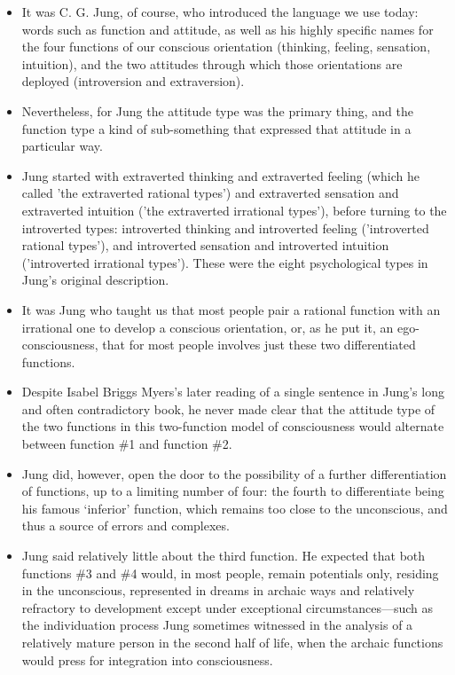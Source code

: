 \begin{itemize}

\item It was C. G. Jung, of course, who introduced the language we use today:
words such as function and attitude, as well as his highly specific names for
the four functions of our conscious orientation (thinking, feeling, sensation,
intuition), and the two attitudes through which those orientations are deployed
(introversion and extraversion).

\item Nevertheless, for Jung the attitude type was the primary thing, and the
function type a kind of sub-something that expressed that attitude in a
particular way.

\item Jung started with extraverted thinking and extraverted feeling (which he
called 'the extraverted rational types') and extraverted sensation and
extraverted intuition ('the extraverted irrational types'), before turning to
the introverted types: introverted thinking and introverted feeling
('introverted rational types'), and introverted sensation and introverted
intuition ('introverted irrational types'). These were the eight psychological
types in Jung's original description.

\item It was Jung who taught us that most people pair a rational function with
an irrational one to develop a conscious orientation, or, as he put it, an
ego-consciousness, that for most people involves just these two differentiated
functions.

\item Despite Isabel Briggs Myers’s later reading of a single sentence in
Jung’s long and often contradictory book, he never made clear that the attitude
type of the two functions in this two-function model of consciousness would
alternate between function \#1 and function \#2.

\item Jung did, however, open the door to the possibility of a further
differentiation of functions, up to a limiting number of four: the fourth to
differentiate being his famous ‘inferior’ function, which remains too close to
the unconscious, and thus a source of errors and complexes.

\item Jung said relatively little about the third function. He expected that
both functions \#3 and \#4 would, in most people, remain potentials only,
residing in the unconscious, represented in dreams in archaic ways and
relatively refractory to development except under exceptional
circumstances—such as the individuation process Jung sometimes witnessed in the
analysis of a relatively mature person in the second half of life, when the
archaic functions would press for integration into consciousness.

\end{itemize}

